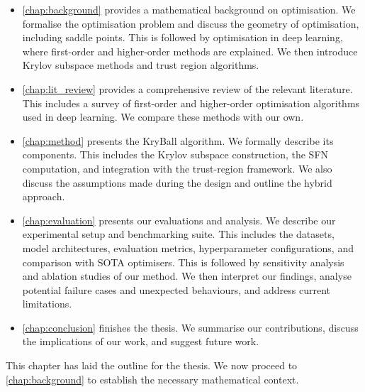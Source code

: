 \begin{itemize}
    \item \cref{chap:background} provides a mathematical background on optimisation. We formalise the optimisation problem and discuss the geometry of optimisation, including saddle points. This is followed by optimisation in deep learning, where first-order and higher-order methods are explained. We then introduce Krylov subspace methods and trust region algorithms.
    \item \cref{chap:lit_review} provides a comprehensive review of the relevant literature. This includes a survey of first-order and higher-order optimisation algorithms used in deep learning. We compare these methods with our own.
    \item \cref{chap:method} presents the KryBall algorithm. We formally describe its components. This includes the Krylov subspace construction, the SFN computation, and integration with the trust-region framework. We also discuss the assumptions made during the design and outline the hybrid approach.
    \item \cref{chap:evaluation} presents our evaluations and analysis. We describe our experimental setup and benchmarking suite. This includes the datasets, model architectures, evaluation metrics, hyperparameter configurations, and comparison with SOTA optimisers. This is followed by sensitivity analysis and ablation studies of our method. We then interpret our findings, analyse potential failure cases and unexpected behaviours, and address current limitations. 
    \item \cref{chap:conclusion} finishes the thesis. We summarise our contributions, discuss the implications of our work, and suggest future work.
\end{itemize}

This chapter has laid the outline for the thesis. We now proceed to \cref{chap:background} to establish the necessary mathematical context.